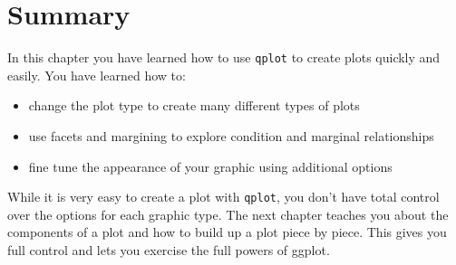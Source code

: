 \section{Summary}

In this chapter you have learned how to use {\tt qplot} to create plots quickly and easily. You have learned how to:

\begin{itemize}
	\item change the plot type to create many different types of plots
	\item use facets and margining to explore condition and marginal relationships
	\item fine tune the appearance of your graphic using additional options
\end{itemize}

While it is very easy to create a plot with {\tt qplot}, you don't have total control over the options for each graphic type.  The next chapter teaches you about the components of a plot and how to build up a plot piece by piece.  This gives you full control and lets you exercise the full powers of ggplot.  


